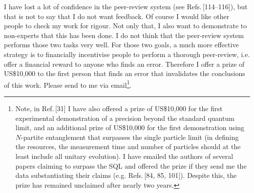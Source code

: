 \documentclass[reqno]{amsart}
\begin{document}
I have lost a lot of confidence in the peer-review system (see Refs.\,[\textcolor{blue!50!black}{114}--\textcolor{blue!50!black}{116}]), but that is not to say that I do not want feedback. Of course I would like other people to check my work for rigour. Not only that, I also want to demonstrate to non-experts that this has been done. I do not think that the peer-review system performs those two tasks very well. For those two goals, a much more effective strategy is to financially incentivise people to perform a thorough peer-review, i.e. offer a financial reward to anyone who finds an error. Therefore I offer a prize of US\$10,000 to the first person that finds an error that invalidates the conclusions of this work. Please send to me via email\footnote{Note, in Ref.\,[\textcolor{blue!50!black}{31}] I have also offered a prize of US\$10,000 for the first experimental demonstration of a precision beyond the standard quantum limit, and an additional prize of US\$10,000 for the first demonstration using $N$-partite entanglement that surpasses the single particle limit (in defining the resources, the measurement time and number of particles should at the least include all unitary evolution). I have emailed the authors of several papers claiming to surpass the SQL and offered the prize if they send me the data substantiating their claims (e.g. Refs.\,[\textcolor{blue!50!black}{84, 85, 101}]). Despite this, the prize has remained unclaimed after nearly two years. }.%

\newpage
\end{document}
